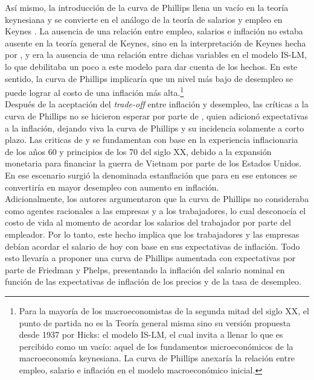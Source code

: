 Así mismo, la introducción de la curva de Phillips llena un vacío en la teoría keynesiana y se convierte en el análogo de la teoría de salarios y empleo en Keynes \citep{tobin1972inflation}. La ausencia de una relación entre empleo, salarios e inflación no estaba ausente en la teoría general de Keynes, sino en la interpretación de Keynes hecha por \cite{hicks1937mr} , y era la ausencia de una relación entre dichas variables en el modelo IS-LM, lo que debilitaba un poco a este modelo para dar cuenta de los hechos. En este sentido, la curva de Phillips implicaría que un nivel más bajo de desempleo se puede lograr al costo de una inflación más alta.\footnote{Para la mayoría de los macroeconomistas de la segunda mitad del siglo XX, el punto de partida no es la Teoría general misma sino su versión propuesta desde 1937 por Hicks: el modelo IS-LM, el cual invita a llenar lo que es percibido como un vacío: aquel de los fundamentos microeconómicos de la macroeconomía keynesiana. La curva de Phillips anexaría la relación entre empleo, salario e inflación en el modelo macroeconómico inicial.} \\

Después de la aceptación del \textit{trade-off} entre inflación y desempleo, las críticas a la curva de Phillips no se hicieron esperar por parte de \cite{friedman1968role}, quien adicionó expectativas a la inflación, dejando viva la curva de Phillips y su incidencia solamente a corto plazo. Las criticas  de \cite{phelps1967phillips} y \cite{friedman1968role}   se fundamentan con base en la experiencia inflacionaria de los años 60 y principios de los 70 del siglo XX, debido a la expansión monetaria para financiar la guerra de Vietnam por parte de los Estados Unidos. En ese escenario surgió la denominada estanflación que para en ese entonces se convertiría en mayor desempleo con aumento en inflación.\\

Adicionalmente, los autores argumentaron que la curva de Phillips no consideraba como agentes racionales a las empresas y a los trabajadores, lo cual desconocía el costo de vida al momento de acordar los salarios del trabajador por parte del empleador. Por lo tanto, este hecho implica que los trabajadores y las empresas debían acordar el salario de hoy con base en sus expectativas de inflación. Todo esto llevaría a proponer una curva de Phillips aumentada con expectativas por parte de Friedman y Phelps, presentando la inflación del salario nominal en función de las expectativas de inflación de los precios y de la tasa de desempleo.\\

